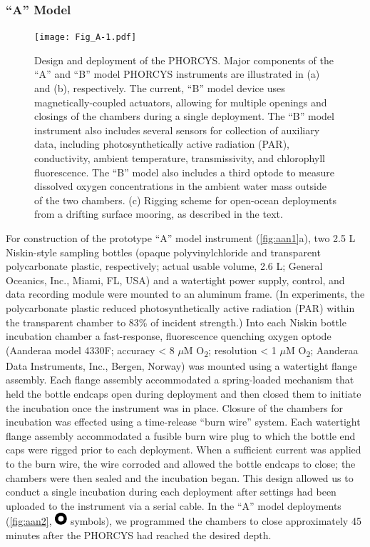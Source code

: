 \subsubsection{``A'' Model}
\begin{figure}[!b]
\centering
\texttt{[image: Fig\_A-1.pdf]}
\caption[Design and deployment of the PHORCYS]{Design and deployment of the PHORCYS. Major components of the ``A'' and ``B'' model PHORCYS instruments are illustrated in (a) and (b), respectively. The current, ``B'' model device uses magnetically-coupled actuators, allowing for multiple openings and closings of the chambers during a single deployment. The ``B'' model instrument also includes several sensors for collection of auxiliary data, including photosynthetically active radiation (PAR), conductivity, ambient temperature, transmissivity, and chlorophyll fluorescence. The ``B'' model also includes a third optode to measure dissolved oxygen concentrations in the ambient water mass outside of the two chambers. (c) Rigging scheme for open-ocean deployments from a drifting surface mooring, as described in the text.
}
\label{fig:aan1}
\end{figure}
For construction of the prototype ``A'' model instrument (\autoref{fig:aan1}a), two 2.5 L Niskin-style sampling bottles (opaque polyvinylchloride and transparent polycarbonate plastic, respectively; actual usable volume, 2.6 L; General Oceanics, Inc., Miami, FL, USA) and a watertight power supply, control, and data recording module were mounted to an aluminum frame. (In experiments, the polycarbonate plastic reduced photosynthetically active radiation (PAR) within the transparent chamber to 83\% of incident strength.) Into each Niskin bottle incubation chamber a fast-response, fluorescence quenching oxygen optode (Aanderaa model 4330F; accuracy \textless{} 8 $\mu$M O\textsubscript{2}; resolution \textless{} 1 $\mu$M O\textsubscript{2}; Aanderaa Data Instruments, Inc., Bergen, Norway) was mounted using a watertight flange assembly. Each flange assembly accommodated a spring-loaded mechanism that held the bottle endcaps open during deployment and then closed them to initiate the incubation once the instrument was in place. Closure of the chambers for incubation was effected using a time-release ``burn wire'' system. Each watertight flange assembly accommodated a fusible burn wire plug to which the bottle end caps were rigged prior to each deployment. When a sufficient current was applied to the burn wire, the wire corroded and allowed the bottle endcaps to close; the chambers were then sealed and the incubation began. This design allowed us to conduct a single incubation during each deployment after settings had been uploaded to the instrument via a serial cable. In the ``A'' model deployments (\autoref{fig:aan2}, \includegraphics[height=\fontcharht\font`\B]{images/Fig_A-Inline1.pdf} symbols), we programmed the chambers to close approximately 45 minutes after the PHORCYS had reached the desired depth.
